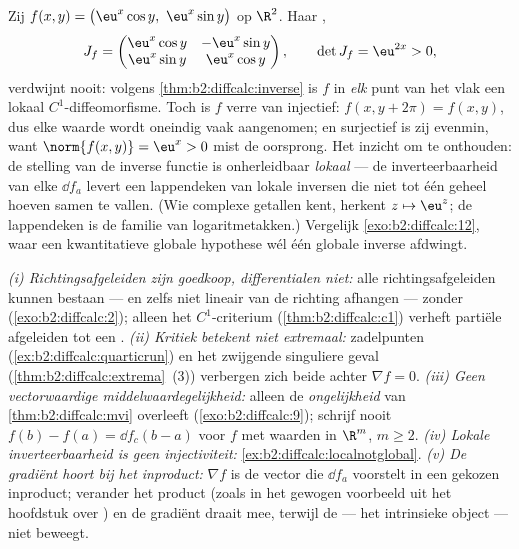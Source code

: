 \begin{example}\label{ex:b2:diffcalc:localnotglobal}
Zij $f(x, y) = \bigl(\eu^x\cos y,\ \eu^x\sin y\bigr)$ op $\R^2$.
Haar ,
\[
J_f = \begin{pmatrix}
\eu^x\cos y & -\eu^x\sin y\\
\eu^x\sin y & \eu^x\cos y
\end{pmatrix},
\qquad
\det J_f = \eu^{2x} > 0 ,
\]
verdwijnt nooit: volgens \cref{thm:b2:diffcalc:inverse} is $f$ in
\emph{elk} punt van het vlak een lokaal $C^1$-diffeomorfisme. Toch
is $f$ verre van injectief: $f(x, y + 2\pi) = f(x, y)$, dus elke
waarde wordt oneindig vaak aangenomen; en surjectief is zij evenmin,
want $\norm{f(x, y)} = \eu^x > 0$ mist de oorsprong. Het inzicht om
te onthouden: de stelling van de inverse functie is onherleidbaar
\emph{lokaal} --- de inverteerbaarheid van elke $\dd f_a$ levert een
lappendeken van lokale inversen die niet tot één geheel hoeven samen
te vallen. (Wie complexe getallen kent, herkent $z \mapsto \eu^z$;
de lappendeken is de familie van logaritmetakken.) Vergelijk
\cref{exo:b2:diffcalc:12}, waar een kwantitatieve globale hypothese
wél één globale inverse afdwingt.
\end{example}

\begin{remark}
\emph{(i) Richtingsafgeleiden zijn goedkoop, differentialen niet:}
alle richtingsafgeleiden kunnen bestaan --- en zelfs niet lineair
van de richting afhangen --- zonder 
(\cref{exo:b2:diffcalc:2}); alleen het $C^1$-criterium
(\cref{thm:b2:diffcalc:c1}) verheft partiële afgeleiden tot een
. \emph{(ii) Kritiek betekent niet extremaal:}
zadelpunten (\cref{ex:b2:diffcalc:quarticrun}) en het zwijgende
singuliere geval (\cref{thm:b2:diffcalc:extrema}~(3)) verbergen
zich beide achter $\nabla f = 0$. \emph{(iii) Geen vectorwaardige
middelwaardegelijkheid:} alleen de \emph{ongelijkheid} van
\cref{thm:b2:diffcalc:mvi} overleeft (\cref{exo:b2:diffcalc:9});
schrijf nooit $f(b) - f(a) = \dd f_c(b-a)$ voor $f$ met waarden in
$\R^m$, $m \geq 2$. \emph{(iv) Lokale inverteerbaarheid is geen
injectiviteit:} \cref{ex:b2:diffcalc:localnotglobal}. \emph{(v) De
gradiënt hoort bij het inproduct:} $\nabla f$ is de vector die $\dd
f_a$ voorstelt in een gekozen inproduct; verander het product (zoals
in het gewogen voorbeeld uit het hoofdstuk over ) en de gradiënt draait mee, terwijl de  --- het
intrinsieke object --- niet beweegt.
\end{remark}

